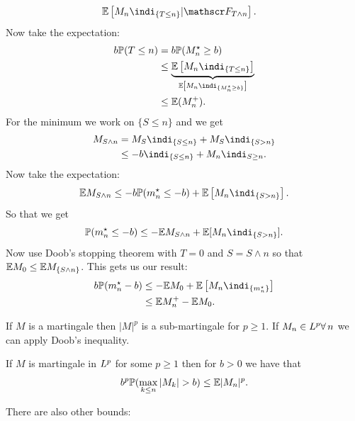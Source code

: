 \documentclass{report}
\begin{document}
\begin{fancyproof}
\begin{align*}
		&\ev\left[M_{n}\indi_{\{T\leq n\}}|\F_{T\wedge n}\right].
	\end{align*}
	Now take the expectation:
	\begin{align*}
		b\pr(T\leq n)&=b\pr(M^{\star}_{n}\geq b)\\
		&\leq\underbrace{\ev\left[M_{n}\indi_{\{T\leq n\}}\right]}_{\mathclap{\ev\left[M_{n}\indi_{\{M_{n}^{\star}\geq b\}}\right]}}\\
		&\leq\ev(M^{+}_{n}).
	\end{align*}
	For the minimum we work on $\{S\leq n\}$ and we get 
	\begin{align*}
		M_{S\wedge n}&=M_{S}\indi_{\{S\leq n\}}+M_{S}\indi_{\{S>n\}}\\
		&\leq-b\indi_{\{S\leq n\}}+M_{n}\indi_{S\geq n}.
	\end{align*}
	Now take the expectation:
	\begin{equation*}
		\ev M_{S\wedge n}\leq-b\pr(m^{\star}_{n}\leq-b)+\ev\left[M_{n}\indi_{\{S>n\}}\right].
	\end{equation*}
	So that we get
	\begin{equation*}
		\pr(m^{\star}_{n}\leq-b)\leq-\ev M_{S\wedge n}+\ev[M_{n}\indi_{\{S>n\}}].
	\end{equation*}
	Now use Doob's stopping theorem with $T=0$ and $S=S\wedge n$ so that $\mathbb{E} M_{0}\leq\mathbb{E} M_{\{S\wedge n\}}$. This gets us our result:
	\begin{align*}
		b\pr(m^{\star}_{n}-b)&\leq-\ev M_{0}+\ev\left[M_{n}\indi_{\{m_{n}^{\star}\}}\right]\\
		&\leq\ev M^{+}_{n}-\ev M_{0}.
	\end{align*}
\end{fancyproof}
\begin{remark}
	If $M$ is a martingale then $|M|^{p}$ is a sub-martingale for $p\geq1$. If $M_{n}\in L^{p}\forall\, n$ we can apply Doob's inequality.
\end{remark}
\begin{corollary}
	If $M$ is martingale in $L^{p}$ for some $p\geq 1$ then for $b>0$ we have that
	\begin{equation*}
		b^{p}\pr(\max_{k\leq n}|M_{k}|>b)\leq\ev|M_{n}|^{p}.
	\end{equation*}
\end{corollary}
There are also other bounds:
\end{document}
